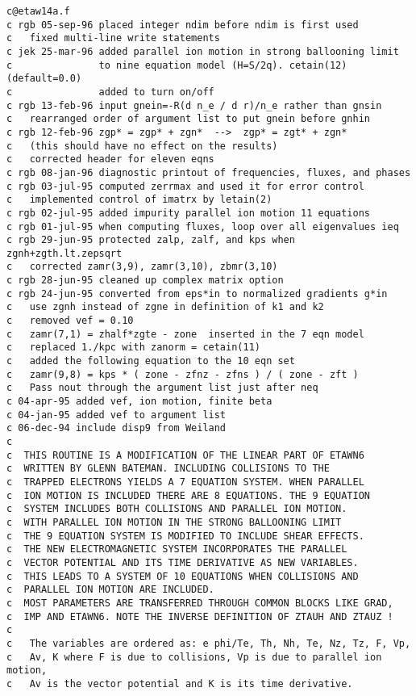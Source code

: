 \begin{verbatim}
c@etaw14a.f
c rgb 05-sep-96 placed integer ndim before ndim is first used
c   fixed multi-line write statements
c jek 25-mar-96 added parallel ion motion in strong ballooning limit
c               to nine equation model (H=S/2q). cetain(12) (default=0.0)
c               added to turn on/off
c rgb 13-feb-96 input gnein=-R(d n_e / d r)/n_e rather than gnsin
c   rearranged order of argument list to put gnein before gnhin
c rgb 12-feb-96 zgp* = zgp* + zgn*  -->  zgp* = zgt* + zgn*
c   (this should have no effect on the results)
c   corrected header for eleven eqns
c rgb 08-jan-96 diagnostic printout of frequencies, fluxes, and phases
c rgb 03-jul-95 computed zerrmax and used it for error control
c   implemented control of imatrx by letain(2)
c rgb 02-jul-95 added impurity parallel ion motion 11 equations
c rgb 01-jul-95 when computing fluxes, loop over all eigenvalues ieq
c rgb 29-jun-95 protected zalp, zalf, and kps when zgnh+zgth.lt.zepsqrt
c   corrected zamr(3,9), zamr(3,10), zbmr(3,10)
c rgb 28-jun-95 cleaned up complex matrix option
c rgb 24-jun-95 converted from eps*in to normalized gradients g*in
c   use zgnh instead of zgne in definition of k1 and k2
c   removed vef = 0.10
c   zamr(7,1) = zhalf*zgte - zone  inserted in the 7 eqn model
c   replaced 1./kpc with zanorm = cetain(11)
c   added the following equation to the 10 eqn set
c   zamr(9,8) = kps * ( zone - zfnz - zfns ) / ( zone - zft )
c   Pass nout through the argument list just after neq
c 04-apr-95 added vef, ion motion, finite beta
c 04-jan-95 added vef to argument list
c 06-dec-94 include disp9 from Weiland
c
c  THIS ROUTINE IS A MODIFICATION OF THE LINEAR PART OF ETAWN6
c  WRITTEN BY GLENN BATEMAN. INCLUDING COLLISIONS TO THE
c  TRAPPED ELECTRONS YIELDS A 7 EQUATION SYSTEM. WHEN PARALLEL
c  ION MOTION IS INCLUDED THERE ARE 8 EQUATIONS. THE 9 EQUATION
c  SYSTEM INCLUDES BOTH COLLISIONS AND PARALLEL ION MOTION.
c  WITH PARALLEL ION MOTION IN THE STRONG BALLOONING LIMIT
c  THE 9 EQUATION SYSTEM IS MODIFIED TO INCLUDE SHEAR EFFECTS.
c  THE NEW ELECTROMAGNETIC SYSTEM INCORPORATES THE PARALLEL
c  VECTOR POTENTIAL AND ITS TIME DERIVATIVE AS NEW VARIABLES.
c  THIS LEADS TO A SYSTEM OF 10 EQUATIONS WHEN COLLISIONS AND
c  PARALLEL ION MOTION ARE INCLUDED.
c  MOST PARAMETERS ARE TRANSFERRED THROUGH COMMON BLOCKS LIKE GRAD,
c  IMP AND ETAWN6. NOTE THE INVERSE DEFINITION OF ZTAUH AND ZTAUZ !
c
c   The variables are ordered as: e phi/Te, Th, Nh, Te, Nz, Tz, F, Vp, 
c   Av, K where F is due to collisions, Vp is due to parallel ion motion,
c   Av is the vector potential and K is its time derivative.

\end{verbatim}
